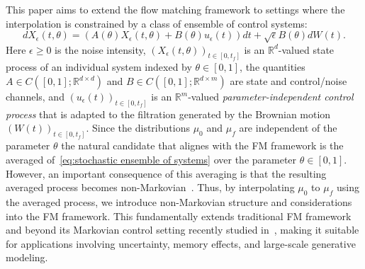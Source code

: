 \documentclass[12pt]{amsart}
\newcommand{\R}{\mathbb{R}}
\renewcommand{\(}{\left (}
\renewcommand{\)}{\right )}
\numberwithin{equation}{section}
\begin{document}
This paper aims to extend the flow matching framework to settings where the interpolation is constrained by a class of ensemble of control systems: %
\begin{equation}\label{eq:stochastic ensemble of systems}
d X_{\epsilon}(t,\theta)=(A(\theta)X_{\epsilon}(t,\theta)+B(\theta)u_{\epsilon}(t))d t+\sqrt{\epsilon}B(\theta)d W(t).
\end{equation}
Here $\epsilon\geq 0$ is the noise intensity, $(X_{\epsilon}(t,\theta))_{t\in[0,t_f]}$ is an $\R^d$-valued state process of an individual system indexed by  $\theta\in[0,1]$, the quantities $A\in C([0,1];\mathbb{R}^{d\times d})$ and $B\in C([0,1];\mathbb{R}^{d\times m})$ are state and control/noise channels, and $(u_{\epsilon}(t))_{t\in[0,t_f]}$ is an $\mathbb{R}^m$-valued \emph{parameter-independent control process} that is adapted to the filtration generated by the Brownian motion $(W(t))_{t\in[0,t_f]}$. Since the distributions $\mu_0$ and $\mu_f$ are independent of the parameter $\theta$ the natural candidate that alignes with the FM framework is the averaged of~\eqref{eq:stochastic ensemble of systems} over the parameter $\theta\in[0,1]$. However, an important consequence of this averaging is that the resulting averaged process becomes non-Markovian~\cite{DOA-YC:23}. 
Thus, by interpolating $\mu_0$ to $\mu_f$ using the averaged process, we introduce non-Markovian structure and considerations into the FM framework. This fundamentally extends traditional FM framework and beyond its Markovian control setting recently studied in~\cite{YM-MA-AT-YC:24}, making it suitable for applications involving uncertainty, memory effects, and large-scale generative modeling.
\end{document}
